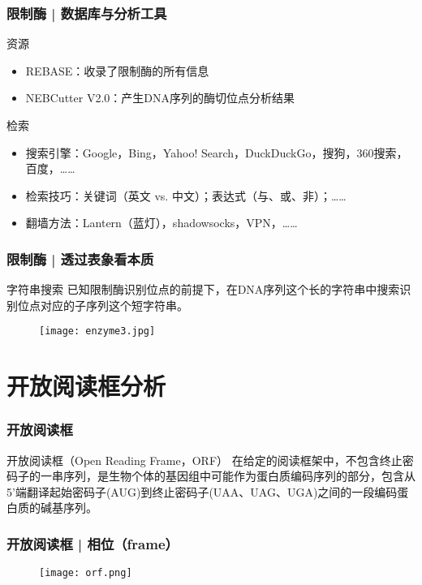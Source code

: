 \begin{frame}
  \frametitle{限制酶 | 数据库与分析工具}
  \begin{block}{资源}
  \begin{itemize}
    \item REBASE：收录了限制酶的所有信息
    \item NEBCutter V2.0：产生DNA序列的酶切位点分析结果
  \end{itemize}
  \end{block}
  \pause
  \begin{block}{检索}
    \begin{itemize}
      \item 搜索引擎：Google，Bing，Yahoo! Search，DuckDuckGo，搜狗，360搜索，百度，……
      \item 检索技巧：关键词（英文 vs. 中文）；表达式（与、或、非）；……
      \item 翻墙方法：Lantern（蓝灯），shadowsocks，VPN，……
    \end{itemize}
  \end{block}
\end{frame}

\begin{frame}
  \frametitle{限制酶 | 透过表象看本质}
  \begin{block}{字符串搜索}
    已知限制酶识别位点的前提下，在DNA序列这个长的字符串中搜索识别位点对应的子序列这个短字符串。
  \end{block}
  \begin{figure}
    \centering
    \texttt{[image: enzyme3.jpg]}
  \end{figure}
\end{frame}

\section{开放阅读框分析}
\begin{frame}
  \frametitle{开放阅读框}
  \begin{block}{开放阅读框（Open Reading Frame，ORF）}
    在给定的阅读框架中，不包含终止密码子的一串序列，是生物个体的基因组中可能作为蛋白质编码序列的部分，包含从5'端翻译起始密码子(AUG)到终止密码子(UAA、UAG、UGA)之间的一段编码蛋白质的碱基序列。
  \end{block}
\end{frame}

\begin{frame}
  \frametitle{开放阅读框 | 相位（frame）}
  \begin{figure}
    \centering
    \texttt{[image: orf.png]}
  \end{figure}
\end{frame}

